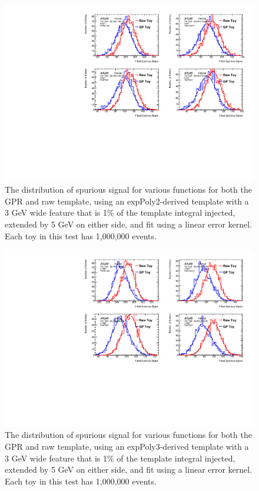 \begin{figure}  
\begin{center}
  \includegraphics[width=\textwidth]{figures/background/gpr/validation/linear/ToyTest_FitSigVals_lowpT_10k_Siginj}   
\caption{The distribution of spurious signal for various functions for both the GPR and raw template, using an expPoly2-derived template with a 3 GeV wide feature that is 1\% of the template integral injected, extended by 5 GeV on either side, and fit using a linear error kernel. Each toy in this test has 1,000,000 events.}
\label{fig:linearkernel_lowpt_10k_Siginj}
\end{center}
\end{figure}

\begin{figure} 
\begin{center}
  \includegraphics[width=\textwidth]{figures/background/gpr/validation/linear/ToyTest_FitSigVals_medpT_10k_Siginj}   
\caption{The distribution of spurious signal for various functions for both the GPR and raw template, using an expPoly3-derived template with a 3 GeV wide feature that is 1\% of the template integral injected, extended by 5 GeV on either side, and fit using a linear error kernel. Each toy in this test has 1,000,000 events.}
\label{fig:linearkernel_medpt_10_Siginj}
\end{center}
\end{figure}

